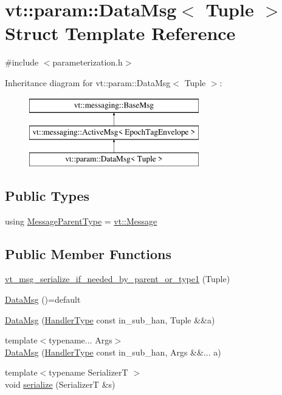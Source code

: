 \hypertarget{structvt_1_1param_1_1_data_msg}{}\section{vt\+:\+:param\+:\+:Data\+Msg$<$ Tuple $>$ Struct Template Reference}
\label{structvt_1_1param_1_1_data_msg}


{\ttfamily \#include $<$parameterization.\+h$>$}

Inheritance diagram for vt\+:\+:param\+:\+:Data\+Msg$<$ Tuple $>$\+:\begin{figure}[H]
\begin{center}
\leavevmode
\includegraphics[height=3.000000cm]{structvt_1_1param_1_1_data_msg}
\end{center}
\end{figure}
\subsection*{Public Types}
\begin{DoxyCompactItemize}
\item 
using \hyperlink{structvt_1_1param_1_1_data_msg_a6a0987fc4a53eb4fb13d9ef73106d7a2}{Message\+Parent\+Type} = \hyperlink{namespacevt_a3a3ddfef40b4c90915fa43cdd5f129ea}{vt\+::\+Message}
\end{DoxyCompactItemize}
\subsection*{Public Member Functions}
\begin{DoxyCompactItemize}
\item 
\hyperlink{structvt_1_1param_1_1_data_msg_a4ea6628cf1850981cbc76ce0d0279e9e}{vt\+\_\+msg\+\_\+serialize\+\_\+if\+\_\+needed\+\_\+by\+\_\+parent\+\_\+or\+\_\+type1} (Tuple)
\item 
\hyperlink{structvt_1_1param_1_1_data_msg_a6035a979b9ee9448fba9dd78cd976ed5}{Data\+Msg} ()=default
\item 
\hyperlink{structvt_1_1param_1_1_data_msg_a288b473f5006d335c443d61e1e749d25}{Data\+Msg} (\hyperlink{namespacevt_af64846b57dfcaf104da3ef6967917573}{Handler\+Type} const in\+\_\+sub\+\_\+han, Tuple \&\&a)
\item 
{\footnotesize template$<$typename... Args$>$ }\\\hyperlink{structvt_1_1param_1_1_data_msg_affab552cda088a887071d4dc3e4236c3}{Data\+Msg} (\hyperlink{namespacevt_af64846b57dfcaf104da3ef6967917573}{Handler\+Type} const in\+\_\+sub\+\_\+han, Args \&\&... a)
\item 
{\footnotesize template$<$typename SerializerT $>$ }\\void \hyperlink{structvt_1_1param_1_1_data_msg_a316dc9cfa260f9b89c8264170745a7fb}{serialize} (SerializerT \&s)
\end{DoxyCompactItemize}

